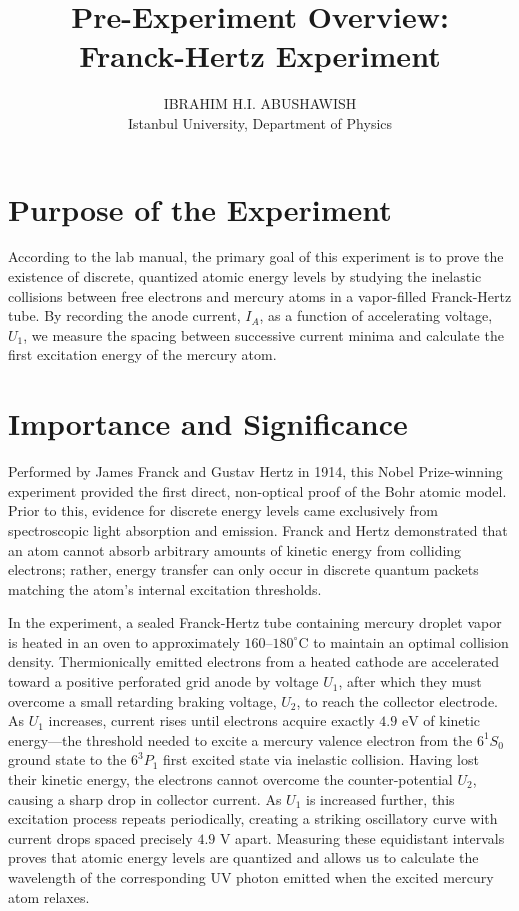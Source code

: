 \documentclass[11pt,a4paper]{article}
\title{\textbf{Pre-Experiment Overview:\\ Franck-Hertz Experiment}}
\author{IBRAHIM H.I. ABUSHAWISH \\ Istanbul University, Department of Physics}
\date{}
\begin{document}
\maketitle

\section*{Purpose of the Experiment}
According to the lab manual, the primary goal of this experiment is to prove the existence of discrete, quantized atomic energy levels by studying the inelastic collisions between free electrons and mercury atoms in a vapor-filled Franck-Hertz tube. By recording the anode current, $I_A$, as a function of accelerating voltage, $U_1$, we measure the spacing between successive current minima and calculate the first excitation energy of the mercury atom.

\section*{Importance and Significance}
Performed by James Franck and Gustav Hertz in 1914, this Nobel Prize-winning experiment provided the first direct, non-optical proof of the Bohr atomic model. Prior to this, evidence for discrete energy levels came exclusively from spectroscopic light absorption and emission. Franck and Hertz demonstrated that an atom cannot absorb arbitrary amounts of kinetic energy from colliding electrons; rather, energy transfer can only occur in discrete quantum packets matching the atom's internal excitation thresholds.

In the experiment, a sealed Franck-Hertz tube containing mercury droplet vapor is heated in an oven to approximately $160$--$180^\circ\text{C}$ to maintain an optimal collision density. Thermionically emitted electrons from a heated cathode are accelerated toward a positive perforated grid anode by voltage $U_1$, after which they must overcome a small retarding braking voltage, $U_2$, to reach the collector electrode. As $U_1$ increases, current rises until electrons acquire exactly $4.9\text{ eV}$ of kinetic energy---the threshold needed to excite a mercury valence electron from the $6^1S_0$ ground state to the $6^3P_1$ first excited state via inelastic collision. Having lost their kinetic energy, the electrons cannot overcome the counter-potential $U_2$, causing a sharp drop in collector current. As $U_1$ is increased further, this excitation process repeats periodically, creating a striking oscillatory curve with current drops spaced precisely $4.9\text{ V}$ apart. Measuring these equidistant intervals proves that atomic energy levels are quantized and allows us to calculate the wavelength of the corresponding UV photon emitted when the excited mercury atom relaxes.
\end{document}
